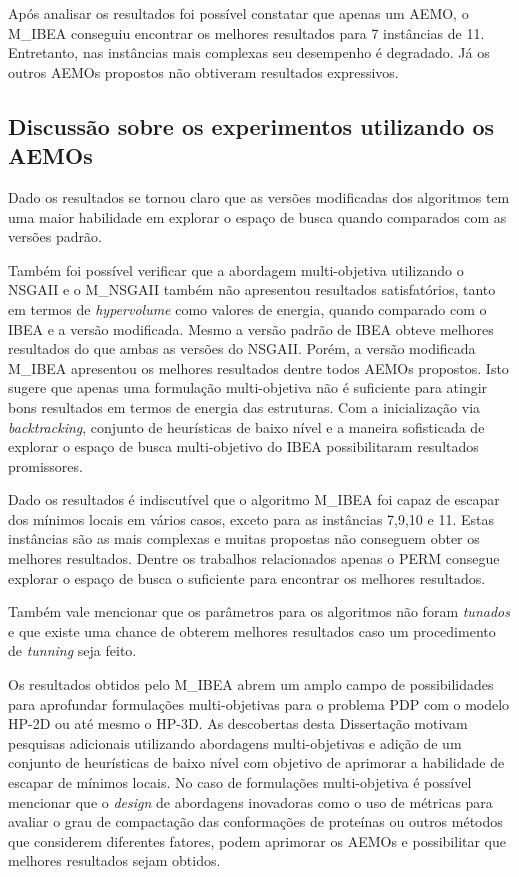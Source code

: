 Após analisar os resultados foi possível constatar que apenas um AEMO, o M\_IBEA conseguiu encontrar os melhores resultados para 7 instâncias de 11. Entretanto, nas instâncias mais complexas seu desempenho é degradado. Já os outros AEMOs propostos não obtiveram resultados expressivos.

\subsection{Discussão sobre os experimentos utilizando os AEMOs}

Dado os resultados se tornou claro que as versões modificadas dos algoritmos tem uma maior habilidade em explorar o espaço de busca quando comparados com as versões padrão.  

Também foi possível verificar que a abordagem multi-objetiva utilizando o NSGAII e o M\_NSGAII também não apresentou resultados satisfatórios, tanto em termos de \textit{hypervolume} como valores de energia,  quando comparado com o IBEA e a versão modificada. Mesmo a versão padrão de IBEA obteve melhores resultados do que ambas as versões do NSGAII. Porém, a versão modificada M\_IBEA apresentou os melhores resultados dentre todos AEMOs propostos. Isto sugere que apenas uma formulação multi-objetiva não é suficiente para atingir bons resultados em termos de energia das estruturas. Com a inicialização via \textit{backtracking}, conjunto de heurísticas de baixo nível e a maneira sofisticada de explorar o espaço de busca multi-objetivo do IBEA  possibilitaram resultados promissores.

Dado os resultados é indiscutível que o algoritmo M\_IBEA foi capaz de escapar dos mínimos locais em vários casos, exceto para as instâncias 7,9,10 e 11. Estas instâncias são as mais complexas e muitas propostas não conseguem obter os melhores resultados. Dentre  os trabalhos relacionados apenas o PERM consegue  explorar o espaço de busca o suficiente para encontrar os melhores resultados.

Também vale mencionar que os parâmetros para os algoritmos não foram \textit{tunados} e que existe uma chance de obterem melhores resultados caso um procedimento de \textit{tunning} seja feito.

Os resultados obtidos pelo M\_IBEA abrem um amplo campo de possibilidades para aprofundar formulações multi-objetivas para o problema PDP com o modelo HP-2D ou até mesmo o HP-3D. As descobertas desta Dissertação motivam pesquisas adicionais utilizando abordagens multi-objetivas e adição de um conjunto de heurísticas de baixo nível com objetivo de aprimorar a habilidade de escapar de mínimos locais. No caso de formulações multi-objetiva é possível mencionar que o \textit{design} de abordagens inovadoras como o uso de métricas para avaliar o grau de compactação das conformações de proteínas ou outros métodos que considerem diferentes fatores, podem aprimorar os AEMOs e possibilitar que melhores resultados sejam obtidos.



